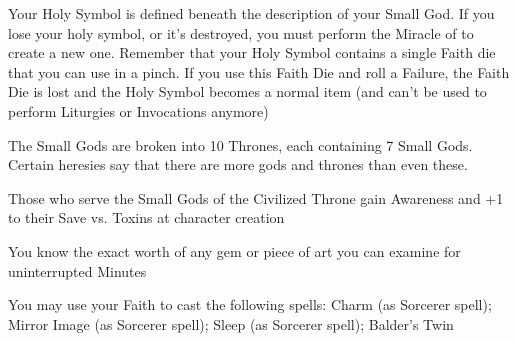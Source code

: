 {Your Holy Symbol is defined beneath the description of your Small God.  If you lose your holy symbol, or it's destroyed, you must perform the Miracle of  to create a new one.  Remember that your Holy Symbol contains a single Faith die that you can use in a pinch.  If you use this Faith Die and roll a Failure, the Faith Die is lost and the Holy Symbol becomes a normal item (and can't be used to perform Liturgies or Invocations anymore)

\newpage


The Small Gods are broken into 10 Thrones, each containing 7 Small Gods.  Certain heresies say that there are more gods and thrones than even these.






Those who serve the Small Gods of the Civilized Throne gain \DCUP Awareness and +1 to their Save vs. Toxins at character creation




\GOD[
  Name=Balder,
  Link=small-god-balder,
  GodOf=Seraph of Beauty and Gems,
  Holy=a silver mirror
]



You know the exact worth of any gem or piece of art you can examine for uninterrupted Minutes


You may use your Faith to cast the following spells: Charm (as Sorcerer spell); Mirror Image (as Sorcerer spell); Sleep (as Sorcerer spell);  Balder's Twin

\LITURGY [
  Name= Balder's Twin,
  Link= balder-liturgy-balders-twin,
  Paradigm= Mind ,
  Save=  N ,
  Duration= \SUMDICE Minutes ,
  Counter=  n/a  ,
  Keywords= None ,
  Target=   Close (touch) mirror
]



}
